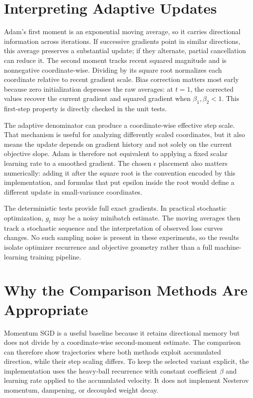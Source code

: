 \documentclass[conference]{IEEEtran}
\begin{document}
\section{Interpreting Adaptive Updates}
Adam's first moment is an exponential moving average, so it carries directional information across iterations. If successive gradients point in similar directions, this average preserves a substantial update; if they alternate, partial cancellation can reduce it. The second moment tracks recent squared magnitude and is nonnegative coordinate-wise. Dividing by its square root normalizes each coordinate relative to recent gradient scale. Bias correction matters most early because zero initialization depresses the raw averages: at $t=1$, the corrected values recover the current gradient and squared gradient when $\beta_1,\beta_2<1$. This first-step property is directly checked in the unit tests.

The adaptive denominator can produce a coordinate-wise effective step scale. That mechanism is useful for analyzing differently scaled coordinates, but it also means the update depends on gradient history and not solely on the current objective slope. Adam is therefore not equivalent to applying a fixed scalar learning rate to a smoothed gradient. The chosen $\epsilon$ placement also matters numerically: adding it after the square root is the convention encoded by this implementation, and formulas that put epsilon inside the root would define a different update in small-variance coordinates.

The deterministic tests provide full exact gradients. In practical stochastic optimization, $g_t$ may be a noisy minibatch estimate. The moving averages then track a stochastic sequence and the interpretation of observed loss curves changes. No such sampling noise is present in these experiments, so the results isolate optimizer recurrence and objective geometry rather than a full machine-learning training pipeline.
\section{Why the Comparison Methods Are Appropriate}
Momentum SGD is a useful baseline because it retains directional memory but does not divide by a coordinate-wise second-moment estimate. The comparison can therefore show trajectories where both methods exploit accumulated direction, while their step scaling differs. To keep the selected variant explicit, the implementation uses the heavy-ball recurrence with constant coefficient $\beta$ and learning rate applied to the accumulated velocity. It does not implement Nesterov momentum, dampening, or decoupled weight decay.
\end{document}

